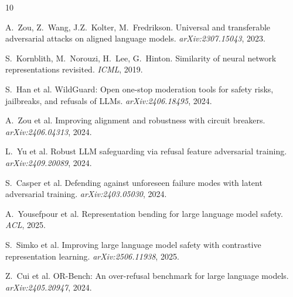 \documentclass[11pt]{article}
\begin{document}
\begin{thebibliography}{10}

A.~Zou, Z.~Wang, J.Z.~Kolter, M.~Fredrikson.
\newblock Universal and transferable adversarial attacks on aligned language models.
\newblock \emph{arXiv:2307.15043}, 2023.

S.~Kornblith, M.~Norouzi, H.~Lee, G.~Hinton.
\newblock Similarity of neural network representations revisited.
\newblock \emph{ICML}, 2019.

S.~Han et al.
\newblock WildGuard: Open one-stop moderation tools for safety risks, jailbreaks, and refusals of LLMs.
\newblock \emph{arXiv:2406.18495}, 2024.

A.~Zou et al.
\newblock Improving alignment and robustness with circuit breakers.
\newblock \emph{arXiv:2406.04313}, 2024.

L.~Yu et al.
\newblock Robust LLM safeguarding via refusal feature adversarial training.
\newblock \emph{arXiv:2409.20089}, 2024.

S.~Casper et al.
\newblock Defending against unforeseen failure modes with latent adversarial training.
\newblock \emph{arXiv:2403.05030}, 2024.

A.~Yousefpour et al.
\newblock Representation bending for large language model safety.
\newblock \emph{ACL}, 2025.

S.~Simko et al.
\newblock Improving large language model safety with contrastive representation learning.
\newblock \emph{arXiv:2506.11938}, 2025.

Z.~Cui et al.
\newblock OR-Bench: An over-refusal benchmark for large language models.
\newblock \emph{arXiv:2405.20947}, 2024.

\end{thebibliography}
\end{document}
